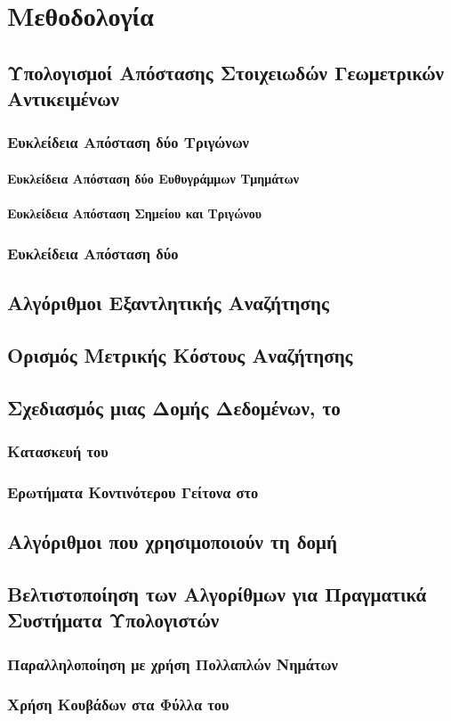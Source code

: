 \chapter{Μεθοδολογία}
\label{ch:methodology}

\section{Υπολογισμοί Απόστασης Στοιχειωδών Γεωμετρικών Αντικειμένων}
\subsection{Ευκλείδεια Απόσταση δύο Τριγώνων}
\subsubsection{Ευκλείδεια Απόσταση δύο Ευθυγράμμων Τμημάτων}
\subsubsection{Ευκλείδεια Απόσταση Σημείου και Τριγώνου}
\subsection{Ευκλείδεια Απόσταση δύο }

\section{Αλγόριθμοι Εξαντλητικής Αναζήτησης}

\section{Ορισμός Μετρικής Κόστους Αναζήτησης}
\label{sec:cost_metric}

\section{Σχεδιασμός μιας  Δομής Δεδομένων, το }
\subsection{Κατασκευή του }
\subsection{Ερωτήματα Κοντινότερου Γείτονα στο }

\section{Αλγόριθμοι που χρησιμοποιούν τη δομή }

\section{Βελτιστοποίηση των Αλγορίθμων για Πραγματικά Συστήματα Υπολογιστών}
\subsection{Παραλληλοποίηση με χρήση Πολλαπλών Νημάτων }
\subsection{Χρήση Κουβάδων στα Φύλλα του }